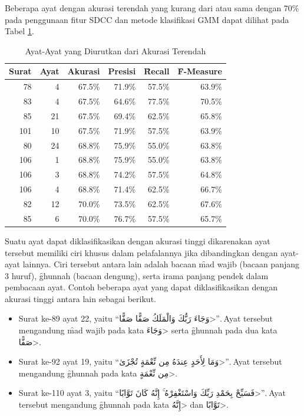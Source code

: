 Beberapa ayat dengan akurasi terendah yang kurang dari atau sama dengan 70\% pada penggunaan fitur SDCC dan metode klasifikasi GMM dapat dilihat pada Tabel \ref{table:akurasirendah}.
\begin{table}
  \centering
  \caption{Ayat-Ayat yang Diurutkan dari Akurasi Terendah}
  \label{table:akurasirendah}
  \begin{tabular}{|r|r|r|r|r|r|}
  \hline
  Surat & Ayat & Akurasi & Presisi & \f{Recall}  & \f{F-Measure} \\ \hline
  78    & 4    & 67.5\%  & 71.9\%  & 57.5\% & 63.9\%    \\ \hline
  83    & 4    & 67.5\%  & 64.6\%  & 77.5\% & 70.5\%    \\ \hline
  85    & 21   & 67.5\%  & 69.4\%  & 62.5\% & 65.8\%    \\ \hline
  101   & 10   & 67.5\%  & 71.9\%  & 57.5\% & 63.9\%    \\ \hline
  80    & 24   & 68.8\%  & 75.9\%  & 55.0\% & 63.8\%    \\ \hline
  106   & 1    & 68.8\%  & 75.9\%  & 55.0\% & 63.8\%    \\ \hline
  106   & 3    & 68.8\%  & 74.2\%  & 57.5\% & 64.8\%    \\ \hline
  106   & 4    & 68.8\%  & 71.4\%  & 62.5\% & 66.7\%    \\ \hline
  82    & 12   & 70.0\%  & 73.5\%  & 62.5\% & 67.6\%    \\ \hline
  85    & 6    & 70.0\%  & 76.7\%  & 57.5\% & 65.7\%    \\ \hline
  \end{tabular}
\end{table}

Suatu ayat dapat diklasifikasikan dengan akurasi tinggi dikarenakan ayat tersebut memiliki ciri khusus dalam pelafalannya jika dibandingkan dengan ayat-ayat lainnya. Ciri tersebut antara lain adalah bacaan \f{mad wajib} (bacaan panjang 3 huruf), \f{ghunnah} (bacaan dengung), serta irama panjang pendek dalam pembacaan ayat. Contoh beberapa ayat yang dapat diklasifikasikan dengan akurasi tinggi antara lain sebagai berikut.
\begin{itemize}
  \item Surat ke-89 ayat 22, yaitu ``\<وَجَاءَ رَبُّكَ وَالْمَلَكُ صَفًّا صَفًّا>''. Ayat tersebut mengandung \f{mad wajib} pada kata \<وَجَاءَ> serta \f{ghunnah} pada dua kata \<صَفًّا>.

  \item Surat ke-92 ayat 19, yaitu ``\<وَمَا لِأَحَدٍ عِندَهُ مِن نِّعْمَةٍ تُجْزَىٰ>''. Ayat tersebut mengandung \f{ghunnah} pada kata \<مِن نِّعْمَةٍ>.

  \item Surat ke-110 ayat 3, yaitu ``\<فَسَبِّحْ بِحَمْدِ رَبِّكَ وَاسْتَغْفِرْهُ ۚ إِنَّهُ كَانَ تَوَّابًا>''. Ayat tersebut mengandung \f{ghunnah} pada kata \<إِنَّهُ> dan \<تَوَّابًا>.
\end{itemize}


















